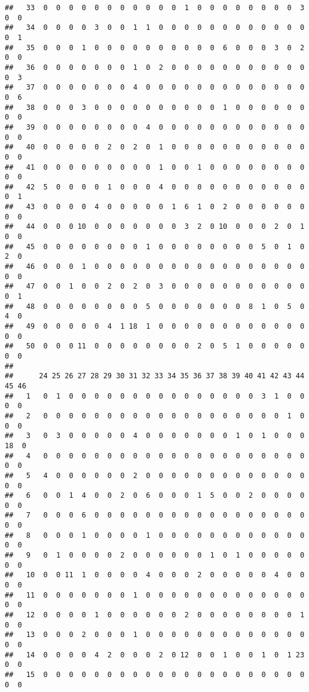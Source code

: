\documentclass[]{article}
\begin{document}
\begin{verbatim}
##   33  0  0  0  0  0  0  0  0  0  0  0  1  0  0  0  0  0  0  0  0  3  0  0
##   34  0  0  0  0  3  0  0  1  1  0  0  0  0  0  0  0  0  0  0  0  0  0  1
##   35  0  0  0  1  0  0  0  0  0  0  0  0  0  0  6  0  0  0  3  0  2  0  0
##   36  0  0  0  0  0  0  0  1  0  2  0  0  0  0  0  0  0  0  0  0  0  0  3
##   37  0  0  0  0  0  0  0  4  0  0  0  0  0  0  0  0  0  0  0  0  0  0  6
##   38  0  0  0  3  0  0  0  0  0  0  0  0  0  0  1  0  0  0  0  0  0  0  0
##   39  0  0  0  0  0  0  0  0  4  0  0  0  0  0  0  0  0  0  0  0  0  0  0
##   40  0  0  0  0  0  2  0  2  0  1  0  0  0  0  0  0  0  0  0  0  0  0  0
##   41  0  0  0  0  0  0  0  0  0  1  0  0  1  0  0  0  0  0  0  0  0  0  0
##   42  5  0  0  0  0  1  0  0  0  4  0  0  0  0  0  0  0  0  0  0  0  0  1
##   43  0  0  0  0  4  0  0  0  0  0  1  6  1  0  2  0  0  0  0  0  0  0  0
##   44  0  0  0 10  0  0  0  0  0  0  0  3  2  0 10  0  0  0  2  0  1  0  0
##   45  0  0  0  0  0  0  0  0  1  0  0  0  0  0  0  0  0  5  0  1  0  2  0
##   46  0  0  0  1  0  0  0  0  0  0  0  0  0  0  0  0  0  0  0  0  0  0  0
##   47  0  0  1  0  0  2  0  2  0  3  0  0  0  0  0  0  0  0  0  0  0  0  1
##   48  0  0  0  0  0  0  0  0  5  0  0  0  0  0  0  0  8  1  0  5  0  4  0
##   49  0  0  0  0  0  4  1 18  1  0  0  0  0  0  0  0  0  0  0  0  0  0  0
##   50  0  0  0 11  0  0  0  0  0  0  0  0  2  0  5  1  0  0  0  0  0  0  0
##     
##      24 25 26 27 28 29 30 31 32 33 34 35 36 37 38 39 40 41 42 43 44 45 46
##   1   0  1  0  0  0  0  0  0  0  0  0  0  0  0  0  0  0  3  1  0  0  0  0
##   2   0  0  0  0  0  0  0  0  0  0  0  0  0  0  0  0  0  0  0  1  0  0  0
##   3   0  3  0  0  0  0  0  4  0  0  0  0  0  0  0  1  0  1  0  0  0 18  0
##   4   0  0  0  0  0  0  0  0  0  0  0  0  0  0  0  0  0  0  0  0  0  0  0
##   5   4  0  0  0  0  0  0  2  0  0  0  0  0  0  0  0  0  0  0  0  0  0  0
##   6   0  0  1  4  0  0  2  0  6  0  0  0  1  5  0  0  2  0  0  0  0  0  0
##   7   0  0  0  6  0  0  0  0  0  0  0  0  0  0  0  0  0  0  0  0  0  0  0
##   8   0  0  0  1  0  0  0  0  1  0  0  0  0  0  0  0  0  0  0  0  0  0  0
##   9   0  1  0  0  0  0  2  0  0  0  0  0  0  1  0  1  0  0  0  0  0  0  0
##   10  0  0 11  1  0  0  0  0  4  0  0  0  2  0  0  0  0  0  4  0  0  0  0
##   11  0  0  0  0  0  0  0  1  0  0  0  0  0  0  0  0  0  0  0  0  0  0  0
##   12  0  0  0  0  1  0  0  0  0  0  0  2  0  0  0  0  0  0  0  0  1  0  0
##   13  0  0  0  2  0  0  0  1  0  0  0  0  0  0  0  0  0  0  0  0  0  0  0
##   14  0  0  0  0  4  2  0  0  0  2  0 12  0  0  1  0  0  1  0  1 23  0  0
##   15  0  0  0  0  0  0  0  0  0  0  0  0  0  0  0  0  0  0  0  0  0  0  0

\end{verbatim}
\end{document}
